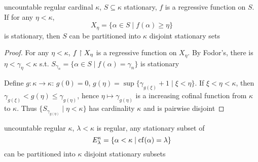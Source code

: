 \documentclass[11pt]{article}
\begin{document}
\begin{lemma}[]
\label{3.3.24}
uncountable regular cardinal \(\kappa\), \(S\subseteq\kappa\) stationary, \(f\) is a regressive function on \(S\). If
for any \(\eta<\kappa\),
\begin{equation*}
X_\eta=\{\alpha\in S\mid f(\alpha)\ge\eta\}
\end{equation*}
is stationary, then \(S\) can be partitioned into \(\kappa\) disjoint stationary sets
\end{lemma}

\begin{proof}
For any \(\eta<\kappa\), \(f\upharpoonright X_\eta\) is a regressive function on \(X_\eta\). By Fodor's, there
is \(\eta<\gamma_\eta<\kappa\) s.t. \(S_{\gamma_n}=\{\alpha\in S\mid f(\alpha)=\gamma_n\}\) is stationary

Define \(g:\kappa\to\kappa\): \(g(0)=0\), \(g(\eta)=\sup\{\gamma_{g(\xi)}+1\mid\xi<\eta\}\). If \(\xi<\eta<\kappa\),
then \(\gamma_{g(\xi)}<g(\eta)\le\gamma_{g(\eta)}\), hence \(\eta\mapsto\gamma_{g(\eta)}\) is a increasing cofinal function from
\(\kappa\) to \(\kappa\). Thus \(\{S_{\gamma_{g(\eta)}}\mid\eta<\kappa\}\) has cardinality \(\kappa\) and is pairwise disjoint
\end{proof}

\begin{lemma}[]
uncountable regular \(\kappa\), \(\lambda<\kappa\) is regular, any stationary subset of
\begin{equation*}
E_\lambda^\kappa=\{\alpha<\kappa\mid\operatorname{cf}(\alpha)=\lambda\}
\end{equation*}
can be partitioned into \(\kappa\) disjoint stationary subsets
\end{lemma}
\end{document}
